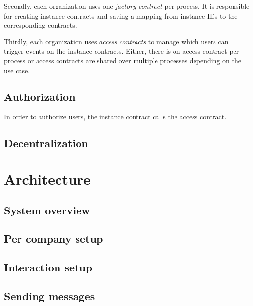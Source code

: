 \documentclass[runningheads]{llncs}
\begin{document}
Secondly, each organization uses one \emph{factory contract} per process.
It is responsible for creating instance contracts and saving a mapping from instance IDs to the corresponding contracts.

Thirdly, each organization uses \emph{access contracts} to manage which users can trigger events on the instance contracts.
Either, there is on access contract per process or access contracts are shared over multiple processes depending on the use case.


\subsection{Authorization}
In order to authorize users, the instance contract calls the access contract.

\subsection{Decentralization}

\section{Architecture}

\subsection{System overview}

\subsection{Per company setup}

\subsection{Interaction setup}

\subsection{Sending messages}
\end{document}

